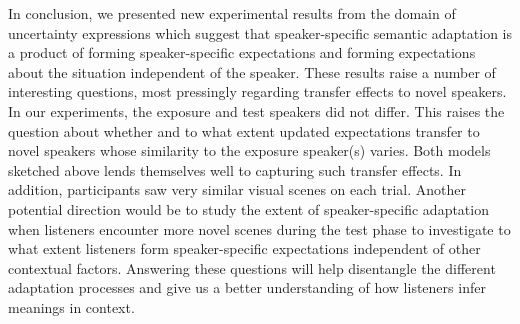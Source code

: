 \documentclass[10pt,letterpaper]{article}
\begin{document}
In conclusion, we presented new experimental results from the domain of uncertainty expressions which suggest that speaker-specific semantic adaptation
is a product of forming speaker-specific expectations and forming expectations about the situation independent of the
speaker.
These results raise a number of interesting questions, most pressingly regarding transfer effects to novel speakers. In our experiments, the exposure and test speakers
did not differ. This raises the question about whether and to what extent updated expectations transfer to novel speakers whose similarity to the exposure speaker(s) varies.
Both models sketched above lends themselves well to capturing such transfer effects.
In addition, participants saw very similar visual scenes on each trial. Another potential direction would be to study the 
extent of speaker-specific adaptation when listeners encounter more novel scenes during the test phase to investigate to what extent
listeners form speaker-specific expectations independent of other contextual factors.
Answering these
questions will help disentangle the different adaptation processes and give us a better understanding
of how listeners infer meanings in context.




%
%





\setlength{\bibleftmargin}{.125in}
\setlength{\bibindent}{-\bibleftmargin}


\end{document}
